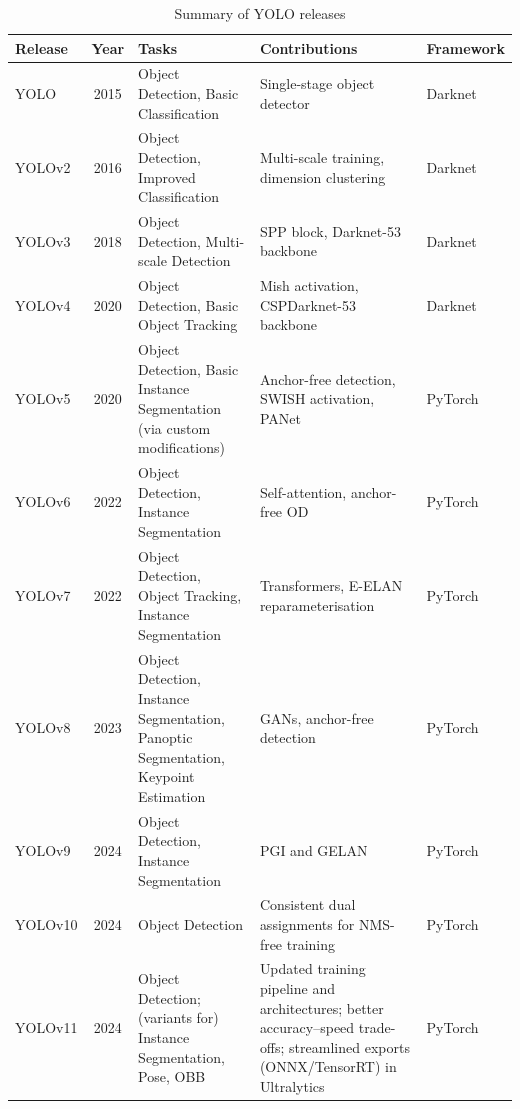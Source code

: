 \documentclass[12pt,a4paper]{report}
\begin{document}
    \begin{table}[t]
    \centering
    \caption{Summary of YOLO releases \cite{khanam2024yolov11}}
    \label{tab:yolo-timeline}
    \renewcommand{\arraystretch}{1.15}
    \begin{tabularx}{\textwidth}{@{} l c X X l @{}}
    \toprule
    \textbf{Release} & \textbf{Year} & \textbf{Tasks} & \textbf{Contributions} & \textbf{Framework} \\
    \midrule
    YOLO     & 2015 & Object Detection, Basic Classification
                   & Single-stage object detector
                   & Darknet \\
    YOLOv2   & 2016 & Object Detection, Improved Classification
                   & Multi-scale training, dimension clustering
                   & Darknet \\
    YOLOv3   & 2018 & Object Detection, Multi-scale Detection
                   & SPP block, Darknet-53 backbone
                   & Darknet \\
    YOLOv4   & 2020 & Object Detection, Basic Object Tracking
                   & Mish activation, CSPDarknet-53 backbone
                   & Darknet \\
    YOLOv5  & 2020 & Object Detection, Basic Instance Segmentation (via custom modifications)
                   & Anchor-free detection, SWISH activation, PANet
                   & PyTorch \\
    YOLOv6  & 2022 & Object Detection, Instance Segmentation
                   & Self-attention, anchor-free OD
                   & PyTorch \\
    YOLOv7  & 2022 & Object Detection, Object Tracking, Instance Segmentation
                   & Transformers, E-ELAN reparameterisation
                   & PyTorch \\
    YOLOv8  & 2023 & Object Detection, Instance Segmentation, Panoptic Segmentation, Keypoint Estimation
                   & GANs, anchor-free detection
                   & PyTorch \\
    YOLOv9  & 2024 & Object Detection, Instance Segmentation
                   & PGI and GELAN
                   & PyTorch \\
    YOLOv10 & 2024 & Object Detection
                   & Consistent dual assignments for NMS-free training
                   & PyTorch \\
    YOLOv11 & 2024 & Object Detection; (variants for) Instance Segmentation, Pose, OBB
               & Updated training pipeline and architectures; better accuracy–speed trade-offs; streamlined exports (ONNX/TensorRT) in Ultralytics
               & PyTorch \\
    \bottomrule
    \end{tabularx}
    \end{table}
\end{document}
